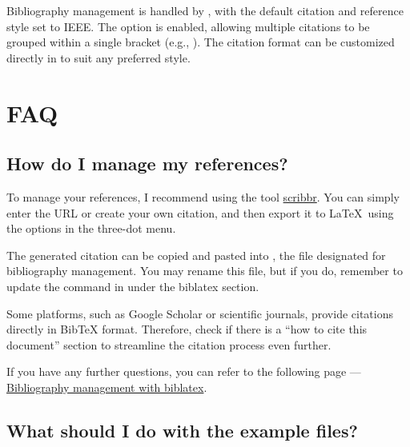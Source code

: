 \documentclass[9pt,a4paper,twocolumn,twoside]{tau-class/tau}
\begin{document}
	Bibliography management is handled by , with the default citation and reference style set to IEEE. The  option is enabled, allowing multiple citations to be grouped within a single bracket (e.g., \cite{davis2023signalflow,bell2022codefont}). The citation format can be customized directly in  to suit any preferred style.

\section{FAQ}

    \subsection*{How do I manage my references?}
        
        To manage your references, I recommend using the tool \href{https://www.scribbr.es/citar/generador/folders/73QOXYsCwMRu4ifQaN65mx/lists/msTfx7GJjIAOUkufbISnA/}{scribbr}. You can simply enter the URL or create your own citation, and then export it to \LaTeX\ using the options in the three-dot menu.
            
        The generated citation can be copied and pasted into , the file designated for bibliography management. You may rename this file, but if you do, remember to update the \inlinecode{} command in  under the biblatex section.
    
        \begin{note}
            Some platforms, such as Google Scholar or scientific journals, provide citations directly in BibTeX format. Therefore, check if there is a ``how to cite this document'' section to streamline the citation process even further.
        \end{note}

        If you have any further questions, you can refer to the following page — \href{https://es.overleaf.com/learn/latex/Bibliography_management_with_biblatex}{Bibliography management with biblatex}.
        
    \subsection*{What should I do with the example files?}
\end{document}

